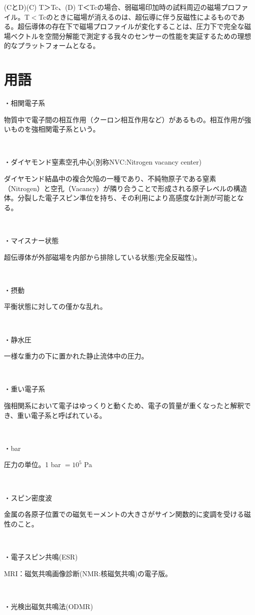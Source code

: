 \documentclass[dvipdfmx]{jsarticle}
\begin{document}
(CとD)(C) T＞Tc、(D) T＜Tcの場合、弱磁場印加時の試料周辺の磁場プロファイル。T$ < $Tcのときに磁場が消えるのは、超伝導に伴う反磁性によるものである。超伝導体の存在下で磁場プロファイルが変化することは、圧力下で完全な磁場ベクトルを空間分解能で測定する我々のセンサーの性能を実証するための理想的なプラットフォームとなる。

\newpage
\section{用語}
・相関電子系

物質中で電子間の相互作用（クーロン相互作用など）があるもの。相互作用が強いものを強相関電子系という。

　　

・ダイヤモンド窒素空孔中心(別称NVC:Nitrogen vacancy center)

ダイヤモンド結晶中の複合欠陥の一種であり、不純物原子である窒素（Nitrogen）と空孔（Vacancy）が隣り合うことで形成される原子レベルの構造体。分裂した電子スピン準位を持ち、その利用により高感度な計測が可能となる。

　　

・マイスナー状態

超伝導体が外部磁場を内部から排除している状態(完全反磁性)。

　　

・摂動

平衡状態に対しての僅かな乱れ。

　　

・静水圧

一様な重力の下に置かれた静止流体中の圧力。

　　

・重い電子系

強相関系において電子はゆっくりと動くため、電子の質量が重くなったと解釈でき、重い電子系と呼ばれている。

　　

・bar

圧力の単位。1 bar $= 10^5$ Pa

　　

・スピン密度波

金属の各原子位置での磁気モーメントの大きさがサイン関数的に変調を受ける磁性のこと。

　　

・電子スピン共鳴(ESR)

MRI：磁気共鳴画像診断(NMR:核磁気共鳴)の電子版。

　　　　

・光検出磁気共鳴法(ODMR)
\end{document}
